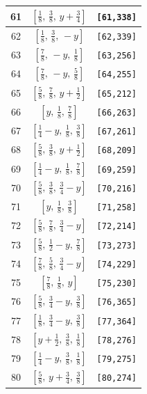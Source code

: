 \documentclass[fleqn,8pt]{jsarticle}
\begin{document}
\begin{longtable}{ccc}
61 & $\left[ \frac{1}{8},\, \frac{3}{8},\, y + \frac{3}{4} \right]$ & {\tt [61,338]} \\ \hline
62 & $\left[ \frac{1}{8},\, \frac{3}{8},\, - y \right]$ & {\tt [62,339]} \\ \hline
63 & $\left[ \frac{7}{8},\, - y,\, \frac{1}{8} \right]$ & {\tt [63,256]} \\ \hline
64 & $\left[ \frac{7}{8},\, - y,\, \frac{5}{8} \right]$ & {\tt [64,255]} \\ \hline
65 & $\left[ \frac{5}{8},\, \frac{7}{8},\, y + \frac{1}{2} \right]$ & {\tt [65,212]} \\ \hline
66 & $\left[ y,\, \frac{1}{8},\, \frac{7}{8} \right]$ & {\tt [66,263]} \\ \hline
67 & $\left[ \frac{1}{4} - y,\, \frac{1}{8},\, \frac{3}{8} \right]$ & {\tt [67,261]} \\ \hline
68 & $\left[ \frac{5}{8},\, \frac{3}{8},\, y + \frac{1}{2} \right]$ & {\tt [68,209]} \\ \hline
69 & $\left[ \frac{1}{4} - y,\, \frac{1}{8},\, \frac{7}{8} \right]$ & {\tt [69,259]} \\ \hline
70 & $\left[ \frac{5}{8},\, \frac{3}{8},\, \frac{3}{4} - y \right]$ & {\tt [70,216]} \\ \hline
71 & $\left[ y,\, \frac{1}{8},\, \frac{3}{8} \right]$ & {\tt [71,258]} \\ \hline
72 & $\left[ \frac{5}{8},\, \frac{7}{8},\, \frac{3}{4} - y \right]$ & {\tt [72,214]} \\ \hline
73 & $\left[ \frac{5}{8},\, \frac{1}{2} - y,\, \frac{7}{8} \right]$ & {\tt [73,273]} \\ \hline
74 & $\left[ \frac{7}{8},\, \frac{5}{8},\, \frac{3}{4} - y \right]$ & {\tt [74,229]} \\ \hline
75 & $\left[ \frac{7}{8},\, \frac{1}{8},\, y \right]$ & {\tt [75,230]} \\ \hline
76 & $\left[ \frac{5}{8},\, \frac{3}{4} - y,\, \frac{3}{8} \right]$ & {\tt [76,365]} \\ \hline
77 & $\left[ \frac{1}{8},\, \frac{3}{4} - y,\, \frac{3}{8} \right]$ & {\tt [77,364]} \\ \hline
78 & $\left[ y + \frac{1}{2},\, \frac{3}{8},\, \frac{1}{8} \right]$ & {\tt [78,276]} \\ \hline
79 & $\left[ \frac{1}{4} - y,\, \frac{3}{8},\, \frac{1}{8} \right]$ & {\tt [79,275]} \\ \hline
80 & $\left[ \frac{5}{8},\, y + \frac{3}{4},\, \frac{3}{8} \right]$ & {\tt [80,274]} \\ \hline

\end{longtable}
\end{document}
